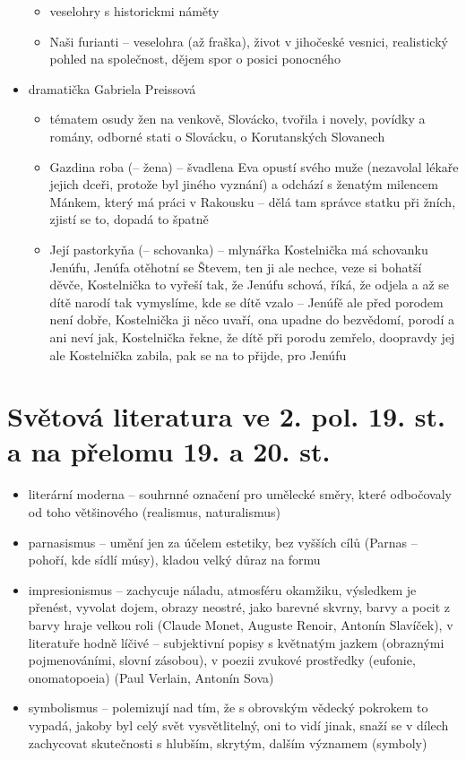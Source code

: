\documentclass{article}
\begin{document}
\begin{itemize}
\begin{itemize}
    \item veselohry s historickmi náměty
    \item Naši furianti -- veselohra (až fraška), život v jihočeské vesnici, realistický pohled na společnost, dějem spor o posici ponocného
  \end{itemize}
  \item dramatička Gabriela Preissová
  \begin{itemize}
    \item tématem osudy žen na venkově, Slovácko, tvořila i novely, povídky a romány, odborné stati o Slovácku, o Korutanských Slovanech
    \item Gazdina roba (-- žena) -- švadlena Eva opustí svého muže (nezavolal lékaře jejich dceři, protože byl jiného vyznání) a odchází s ženatým milencem Mánkem, který má práci v Rakousku -- dělá tam správce statku při žních, zjistí se to, dopadá to špatně
    \item Její pastorkyňa (-- schovanka) -- mlynářka Kostelnička má schovanku Jenúfu, Jenúfa otěhotní se Števem, ten ji ale nechce, veze si bohatší děvče, Kostelnička to vyřeší tak, že Jenúfu schová, říká, že odjela a až se dítě narodí tak vymyslíme, kde se dítě vzalo -- Jenúfě ale před porodem není dobře, Kostelnička ji něco uvaří, ona upadne do bezvědomí, porodí a ani neví jak, Kostelnička řekne, že dítě při porodu zemřelo, doopravdy jej ale Kostelnička zabila, pak se na to přijde, pro Jenúfu
  \end{itemize}
\end{itemize}

\part{Světová literatura ve 2. pol. 19. st. a na přelomu 19. a 20. st.}
\begin{itemize}
  \item literární moderna -- souhrnné označení pro umělecké směry, které odbočovaly od toho většinového (realismus, naturalismus)
  \item parnasismus -- umění jen za účelem estetiky, bez vyšších cílů (Parnas -- pohoří, kde sídlí músy), kladou velký důraz na formu
  \item impresionismus -- zachycuje náladu, atmosféru okamžiku, výsledkem je přenést, vyvolat dojem, obrazy neostré, jako barevné skvrny, barvy a pocit z barvy hraje velkou roli (Claude Monet, Auguste Renoir, Antonín Slavíček), v literatuře hodně líčivé -- subjektivní popisy s květnatým jazkem (obraznými pojmenováními, slovní zásobou), v poezii zvukové prostředky (eufonie, onomatopoeia) (Paul Verlain, Antonín Sova)
  \item symbolismus -- polemizují nad tím, že s obrovským vědecký pokrokem to vypadá, jakoby byl celý svět vysvětlitelný, oni to vidí jinak, snaží se v dílech zachycovat skutečnosti s hlubším, skrytým, dalším významem (symboly)
\end{itemize}
\end{document}
